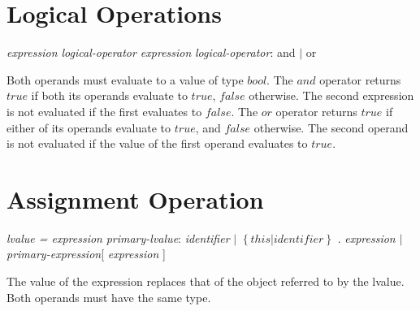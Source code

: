 \begin{homeworkProblem}
    \section{Logical Operations}
\textit{expression logical-operator expression}
    \newline
    \textit{logical-operator}: and $|$ or

    Both operands must evaluate to a value of type $bool$. The $and$ operator returns $true$ if both its operands evaluate to $true$, $false$ otherwise. The second expression is not evaluated if the first evaluates to $false$. The $or$ operator returns $true$ if either of its operands evaluate to $true$, and $false$ otherwise. The second operand is not evaluated if the value of the first operand evaluates to $true$.

    \section{Assignment Operation}
    \textit{lvalue = expression}
    \newline
    \textit{primary-lvalue}: \textit{identifier} $|$ $\left\{this | \textit{identifier} \right\}$ . \textit{expression} $|$ \textit{primary-expression}[ \textit{expression} ]

    The value of the expression replaces that of the object referred to by the lvalue. Both operands must have the same type.
    \end{homeworkProblem}

